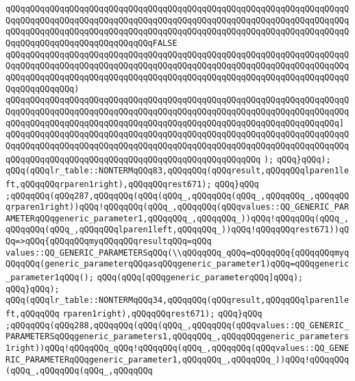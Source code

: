 \verb|qQQqqQQqqQQqqQQqqQQqqQQqqQQqqQQqqQQqqQQqqQQqqQQqqQQqqQQqqQQqqQQqqQQqqQQqqQQqqQQqqQQqqQQqqQQqqQQqqQQqqQQqqQQqqQQqqQQqqQQqqQQqqQQqqQQqqQQqqQQqqQQqqQQqqQQqqQQqqQQqqQQqqQQqqQQqqQQqqQQqqQQqqQQqqQQqqQQqqQQqqQQqqQQqqQQqqQQqqQQqqQQqqQQqqQQqqQQqqQQqFALSE|\newline
\verb|qQQqqQQqqQQqqQQqqQQqqQQqqQQqqQQqqQQqqQQqqQQqqQQqqQQqqQQqqQQqqQQqqQQqqQQqqQQqqQQqqQQqqQQqqQQqqQQqqQQqqQQqqQQqqQQqqQQqqQQqqQQqqQQqqQQqqQQqqQQqqQQqqQQqqQQqqQQqqQQqqQQqqQQqqQQqqQQqqQQqqQQqqQQqqQQqqQQqqQQqqQQqqQQqqQQqqQQqqQQqqQQq)|\newline
\verb|qQQqqQQqqQQqqQQqqQQqqQQqqQQqqQQqqQQqqQQqqQQqqQQqqQQqqQQqqQQqqQQqqQQqqQQqqQQqqQQqqQQqqQQqqQQqqQQqqQQqqQQqqQQqqQQqqQQqqQQqqQQqqQQqqQQqqQQqqQQqqQQqqQQqqQQqqQQqqQQqqQQqqQQqqQQqqQQqqQQqqQQqqQQqqQQqqQQqqQQqqQQqqQQq]|\newline
\verb|qQQqqQQqqQQqqQQqqQQqqQQqqQQqqQQqqQQqqQQqqQQqqQQqqQQqqQQqqQQqqQQqqQQqqQQqqQQqqQQqqQQqqQQqqQQqqQQqqQQqqQQqqQQqqQQqqQQqqQQqqQQqqQQqqQQqqQQqqQQqqQQqqQQqqQQqqQQqqQQqqQQqqQQqqQQqqQQqqQQqqQQqqQQqqQQq|\newline
\verb|);|\newline
\verb|qQQq}qQQq);|\newline
\verb|qQQq(qQQqlr_table::NONTERMqQQq83,qQQqqQQq(qQQqresult,qQQqqQQqlparen1left,qQQqqQQqrparen1right),qQQqqQQqrest671);|\newline
\verb|qQQq}qQQq|\newline
\verb|;qQQqqQQq(qQQq287,qQQqqQQq(qQQq(qQQq_,qQQqqQQq(qQQq_,qQQqqQQq_,qQQqqQQqrparen1right))qQQq!qQQqqQQq(qQQq_,qQQqqQQq(qQQqvalues::QQ_GENERIC_PARAMETERqQQqgeneric_parameter1,qQQqqQQq_,qQQqqQQq_))qQQq!qQQqqQQq(qQQq_,qQQqqQQq(qQQq_,qQQqqQQqlparen1left,qQQqqQQq_))qQQq!qQQqqQQqrest671))qQQq=>qQQq{qQQqqQQqmyqQQqqQQqresultqQQq=qQQq|\newline
\verb|values::QQ_GENERIC_PARAMETERSqQQq(\\qQQqqQQq_qQQq=qQQqqQQq{qQQqqQQqmyqQQqqQQq(generic_parameterqQQqasqQQqgeneric_parameter1)qQQq=qQQqgeneric_parameter1qQQq();|\newline
\verb|qQQq(qQQq[qQQqgeneric_parameterqQQq]qQQq);|\newline
\verb|qQQq}qQQq);|\newline
\verb|qQQq(qQQqlr_table::NONTERMqQQq34,qQQqqQQq(qQQqresult,qQQqqQQqlparen1left,qQQqqQQq|\newline
\verb|rparen1right),qQQqqQQqrest671);|\newline
\verb|qQQq}qQQq|\newline
\verb|;qQQqqQQq(qQQq288,qQQqqQQq(qQQq(qQQq_,qQQqqQQq(qQQqvalues::QQ_GENERIC_PARAMETERSqQQqgeneric_parameters1,qQQqqQQq_,qQQqqQQqgeneric_parameters1right))qQQq!qQQqqQQq_qQQq!qQQqqQQq(qQQq_,qQQqqQQq(qQQqvalues::QQ_GENERIC_PARAMETERqQQqgeneric_parameter1,qQQqqQQq_,qQQqqQQq_))qQQq!qQQqqQQq(qQQq_,qQQqqQQq(qQQq_,qQQqqQQq|\newline
